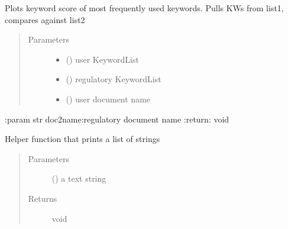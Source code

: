 \documentclass[letterpaper,10pt,english]{sphinxmanual}
\begin{document}
\begin{fulllineitems}
\label{\detokenize{functionsv1:common_functions.plotkeywordscores}}
Plots keyword score of most frequently used keywords. Pulls KWs from list1, compares against list2
\begin{quote}\begin{description}
\item[{Parameters}] \leavevmode\begin{itemize}
\item {} 
 ({\hyperref[\detokenize{KeywordList:module-KeywordList}]{}}) \textendash{} user KeywordList

\item {} 
 ({\hyperref[\detokenize{KeywordList:module-KeywordList}]{}}) \textendash{} regulatory KeywordList

\item {} 
 () \textendash{} user document name

\end{itemize}

\end{description}\end{quote}

:param str doc2name:regulatory document name
:return: void

\end{fulllineitems}


\begin{fulllineitems}
\label{\detokenize{functionsv1:common_functions.printStringList}}
Helper function that prints a list of strings
\begin{quote}\begin{description}
\item[{Parameters}] \leavevmode
{} (\sphinxstyleliteralemphasis{{[}}\sphinxstyleliteralemphasis{{]}}) \textendash{} a text string

\item[{Returns}] \leavevmode
void

\end{description}\end{quote}

\end{fulllineitems}
\end{document}

